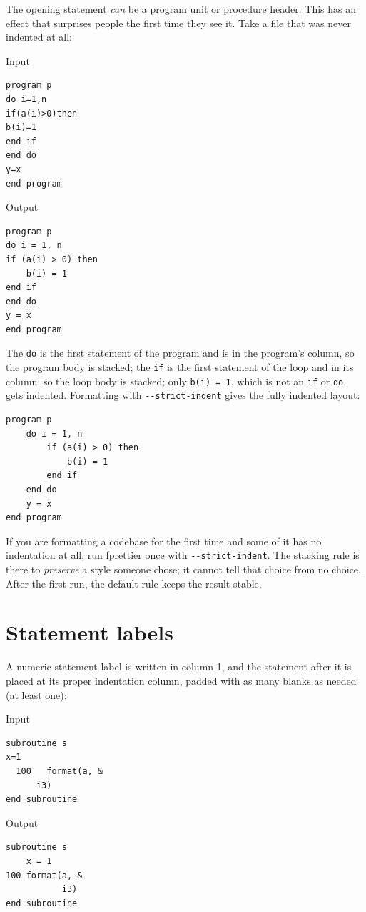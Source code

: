 \documentclass[11pt,a4paper,openany]{book}
\newcommand{\code}[1]{\texttt{\small #1}}
\newcommand{\flag}[1]{\texttt{\small -{}-#1}}
\newenvironment{beforecol}{\noindent\begin{minipage}[t]{0.485\linewidth}\textsf{\footnotesize\color{commentc}Input}}{\end{minipage}\hfill}
\newenvironment{aftercol}{\begin{minipage}[t]{0.485\linewidth}\textsf{\footnotesize\color{commentc}Output}}{\end{minipage}\par\medskip}
\begin{document}
The opening statement \emph{can} be a program unit or procedure header. This
has an effect that surprises people the first time they see it. Take a file
that was never indented at all:

\begin{beforecol}
\begin{lstlisting}[style=before]
program p
do i=1,n
if(a(i)>0)then
b(i)=1
end if
end do
y=x
end program
\end{lstlisting}
\end{beforecol}
\begin{aftercol}
\begin{lstlisting}[style=after]
program p
do i = 1, n
if (a(i) > 0) then
    b(i) = 1
end if
end do
y = x
end program
\end{lstlisting}
\end{aftercol}

The \code{do} is the first statement of the program and is in the program's
column, so the program body is stacked; the \code{if} is the first statement of
the loop and in its column, so the loop body is stacked; only \code{b(i) = 1},
which is not an \code{if} or \code{do}, gets indented. Formatting with
\flag{strict-indent} gives the fully indented layout:

\begin{lstlisting}[style=after]
program p
    do i = 1, n
        if (a(i) > 0) then
            b(i) = 1
        end if
    end do
    y = x
end program
\end{lstlisting}

\begin{pitfall}
If you are formatting a codebase for the first time and some of it has no
indentation at all, run fprettier once with \flag{strict-indent}. The
stacking rule is there to \emph{preserve} a style someone chose; it cannot tell
that choice from no choice. After the first run, the default rule keeps
the result stable.
\end{pitfall}

\section{Statement labels}

A numeric statement label is written in column 1, and the statement after it is
placed at its proper indentation column, padded with as many blanks as needed
(at least one):

\begin{beforecol}
\begin{lstlisting}[style=before]
subroutine s
x=1
  100   format(a, &
      i3)
end subroutine
\end{lstlisting}
\end{beforecol}
\begin{aftercol}
\begin{lstlisting}[style=after]
subroutine s
    x = 1
100 format(a, &
           i3)
end subroutine
\end{lstlisting}
\end{aftercol}
\end{document}
